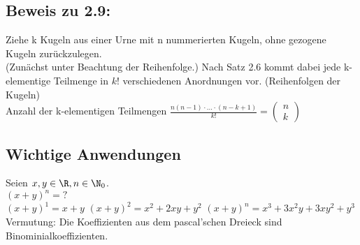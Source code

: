 \subsection*{Beweis zu 2.9:}
Ziehe k Kugeln aus einer Urne mit n nummerierten Kugeln, ohne gezogene Kugeln zurückzulegen.\\
(Zunächst unter Beachtung der Reihenfolge.)
Nach Satz 2.6 kommt dabei jede k-elementige Teilmenge in $k!$ verschiedenen Anordnungen vor. (Reihenfolgen der Kugeln)\\
Anzahl der k-elementigen Teilmengen $\frac{n(n-1) \cdot ... \cdot (n-k+1)}{k!} = \begin{pmatrix}
n\\k
\end{pmatrix}$\\
\subsection*{Wichtige Anwendungen}
Seien $x, y\in \R, n \in \N_0$.\\
$(x+y)^n = ?$\\
$(x+y)^1 = x+y$
$(x+y)^2 = x^2 + 2xy + y^2$
$(x+y)^n = x^3 + 3x^2y + 3xy^2 + y^3$
Vermutung: Die Koeffizienten aus dem pascal'schen Dreieck sind Binominialkoeffizienten.\\